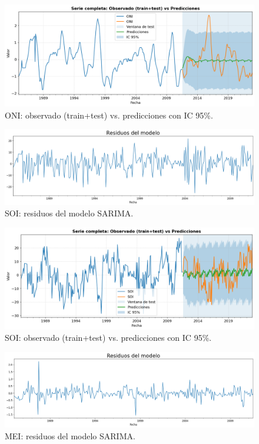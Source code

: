\begin{figure}[H]\centering
\includegraphics[scale=.42]{Figures/pred_oni.png}
\caption{ONI: observado (train+test) vs. predicciones con IC 95\%.}
\label{fig:pred_oni}
\end{figure}



\begin{figure}[H]\centering
\includegraphics[scale=.30]{Figures/res_sarima_soi.png}
\caption{SOI: residuos del modelo SARIMA.}
\label{fig:res_soi}
\end{figure}


\begin{figure}[H]\centering
\includegraphics[scale=.42]{Figures/pred_soi.png}
\caption{SOI: observado (train+test) vs. predicciones con IC 95\%.}
\label{fig:pred_soi}
\end{figure}

\begin{figure}[H]\centering
\includegraphics[scale=.30]{Figures/res_sarima_mei.png}
\caption{MEI: residuos del modelo SARIMA.}
\label{fig:res_mei}
\end{figure}


